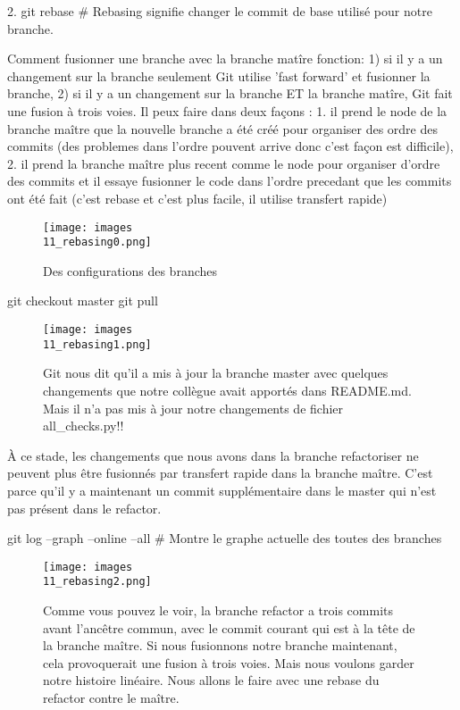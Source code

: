 \documentclass[11pt, onecolumn]{article}
\begin{document}
2. git rebase     # Rebasing signifie changer le commit de base utilisé pour notre branche.

Comment fusionner une branche avec la branche matîre fonction: 1) si il y a un changement sur la branche seulement Git utilise 'fast forward' et fusionner la branche, 2) si il y a un changement sur la branche ET la branche matîre, Git fait une fusion à trois voies.  Il peux faire dans deux façons : 1. il prend le node de la branche maître que la nouvelle branche a été créé pour organiser des ordre des commits (des problemes dans l'ordre pouvent arrive donc c'est façon est difficile), 2. il prend la branche maître plus recent comme le node pour organiser d'ordre des commits et il essaye fusionner le code dans l'ordre precedant que les commits ont été fait (c'est rebase et c'est plus facile, il utilise transfert rapide)

\begin{figure}[h]
\begin{center}
\texttt{[image: images\\11\_rebasing0.png]}
\end{center}
\caption{Des configurations des branches}
\label{11_rebasing0}
\end{figure}

git checkout master
git pull

\begin{figure}[h]
\begin{center}
\texttt{[image: images\\11\_rebasing1.png]}
\end{center}
\caption{Git nous dit qu'il a mis à jour la branche master avec quelques changements que notre collègue
avait apportés dans README.md. Mais il n'a pas mis à jour notre changements de fichier all_checks.py!!}
\label{11_rebasing1}
\end{figure}


À ce stade, les changements que nous avons dans la branche refactoriser ne peuvent plus être fusionnés
par transfert rapide dans la branche maître. C'est parce qu'il y a maintenant un commit supplémentaire dans le master qui n'est pas présent dans le refactor. 

git log --graph --online --all     # Montre le graphe actuelle des toutes des branches

\begin{figure}[h]
\begin{center}
\texttt{[image: images\\11\_rebasing2.png]}
\end{center}
\caption{Comme vous pouvez le voir, la branche refactor a trois commits avant l'ancêtre commun,
avec le commit courant qui est à la tête de la branche maître.
Si nous fusionnons notre branche maintenant, cela provoquerait une fusion à trois voies.
Mais nous voulons garder notre histoire linéaire.
Nous allons le faire avec une rebase du refactor contre le maître. }
\label{11_rebasing2}
\end{figure}
\end{document}
